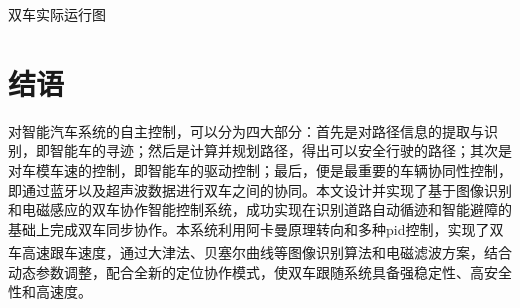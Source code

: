 \documentclass{article}%
\begin{document}
\begin{multicols}{2}
		\begin{center}
			\caption{双车实际运行图}		
		\end{center}

		\section{结语}
		对智能汽车系统的自主控制，可以分为四大部分：首先是对路径信息的提取与识别，即智能车的寻迹；然后是计算并规划路径，得出可以安全行驶的路径；其次是对车模车速的控制，即智能车的驱动控制；最后，便是最重要的车辆协同性控制，即通过蓝牙以及超声波数据进行双车之间的协同。本文设计并实现了基于图像识别和电磁感应的双车协作智能控制系统，成功实现在识别道路自动循迹和智能避障的基础上完成双车同步协作。本系统利用阿卡曼原理转向和多种pid控制，实现了双车高速跟车速度，通过大津法、贝塞尔曲线\textsuperscript{\cite{ref11}}等图像识别算法和电磁滤波方案，结合动态参数调整，配合全新的定位协作模式，使双车跟随系统具备强稳定性、高安全性和高速度。
				
		\begin{thebibliography}{15}%
			

\end{thebibliography}
\end{multicols}
\end{document}
